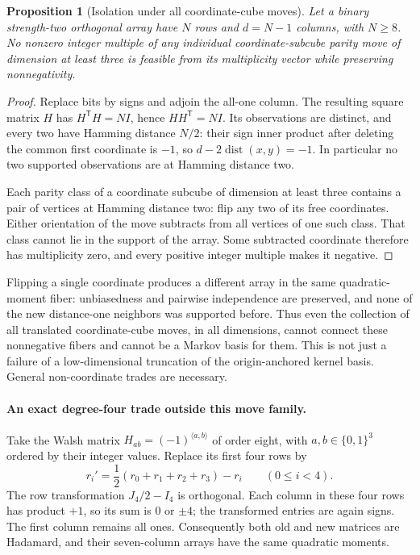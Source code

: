 \documentclass[11pt]{article}
\newtheorem{proposition}{Proposition}[section]
\begin{document}
\begin{proposition}[Isolation under all coordinate-cube moves]
Let a binary strength-two orthogonal array have $N$ rows and $d=N-1$
columns, with $N\ge8$. No nonzero integer multiple of any individual
coordinate-subcube parity move of dimension at least three is feasible
from its multiplicity vector while preserving nonnegativity.
\end{proposition}
\begin{proof}
Replace bits by signs and adjoin the all-one column. The resulting square
matrix $H$ has $H^{\mathsf T}H=NI$, hence $HH^{\mathsf T}=NI$. Its
observations are distinct, and every two have Hamming distance $N/2$:
their sign inner product after deleting the common first coordinate is
$-1$, so $d-2\operatorname{dist}(x,y)=-1$. In particular no two
supported observations are at Hamming distance two.

Each parity class of a coordinate subcube of dimension at least three
contains a pair of vertices at Hamming distance two: flip any two of its
free coordinates. Either orientation of the move subtracts from all
vertices of one such class. That class cannot lie in the support of the
array. Some subtracted coordinate therefore has multiplicity zero, and
every positive integer multiple makes it negative.
\end{proof}

Flipping a single coordinate produces a different array in the same
quadratic-moment fiber: unbiasedness and pairwise independence are
preserved, and none of the new distance-one neighbors was supported
before. Thus even the collection of all translated coordinate-cube moves,
in all dimensions, cannot connect these nonnegative fibers and cannot
be a Markov basis for them. This is not just a failure of a low-dimensional truncation of the
origin-anchored kernel basis. General non-coordinate trades are necessary.

\paragraph{An exact degree-four trade outside this move family.}
Take the Walsh matrix $H_{ab}=(-1)^{\langle a,b\rangle}$ of order eight,
with $a,b\in\{0,1\}^3$ ordered by their integer values. Replace its
first four rows by
\[
 r_i'=\frac12(r_0+r_1+r_2+r_3)-r_i\qquad(0\le i<4).
\]
The row transformation $J_4/2-I_4$ is orthogonal. Each column in these
four rows has product $+1$, so its sum is $0$ or $\pm4$; the transformed
entries are again signs. The first column remains all ones. Consequently
both old and new matrices are Hadamard, and their seven-column arrays
have the same quadratic moments.
\end{document}
